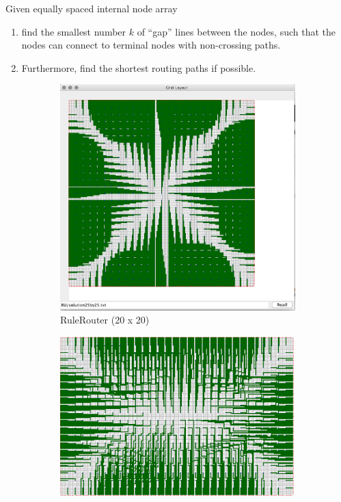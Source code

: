 \documentclass{article}
\begin{document}
\begin{spacing}{1.1}
    Given equally spaced internal node array
    \begin{enumerate}[label = \alph*]
        \item find the smallest number $k$ of ``gap'' lines between the nodes, such that the nodes can connect to terminal nodes with non-crossing paths.
        \item Furthermore, find the shortest routing paths if possible.
    \end{enumerate}
    \begin{figure}[H]
        \centering
        \begin{subfigure}{0.3\textwidth}
            \includegraphics[width = \textwidth]{ove1.png}
            \caption{RuleRouter (20 x 20)}
        \end{subfigure}
        \begin{subfigure}{0.3\textwidth}
            \includegraphics[width = \textwidth]{ove2.png}

\end{subfigure}
\end{figure}
\end{spacing}
\end{document}
